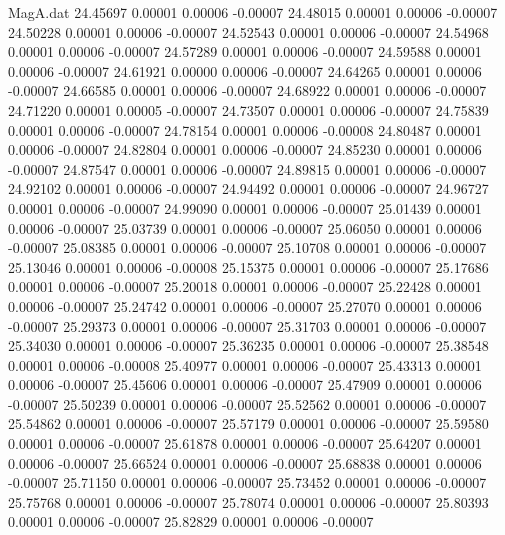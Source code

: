 \begin{filecontents}{MagA.dat}
  24.45697    0.00001    0.00006   -0.00007
  24.48015    0.00001    0.00006   -0.00007
  24.50228    0.00001    0.00006   -0.00007
  24.52543    0.00001    0.00006   -0.00007
  24.54968    0.00001    0.00006   -0.00007
  24.57289    0.00001    0.00006   -0.00007
  24.59588    0.00001    0.00006   -0.00007
  24.61921    0.00000    0.00006   -0.00007
  24.64265    0.00001    0.00006   -0.00007
  24.66585    0.00001    0.00006   -0.00007
  24.68922    0.00001    0.00006   -0.00007
  24.71220    0.00001    0.00005   -0.00007
  24.73507    0.00001    0.00006   -0.00007
  24.75839    0.00001    0.00006   -0.00007
  24.78154    0.00001    0.00006   -0.00008
  24.80487    0.00001    0.00006   -0.00007
  24.82804    0.00001    0.00006   -0.00007
  24.85230    0.00001    0.00006   -0.00007
  24.87547    0.00001    0.00006   -0.00007
  24.89815    0.00001    0.00006   -0.00007
  24.92102    0.00001    0.00006   -0.00007
  24.94492    0.00001    0.00006   -0.00007
  24.96727    0.00001    0.00006   -0.00007
  24.99090    0.00001    0.00006   -0.00007
  25.01439    0.00001    0.00006   -0.00007
  25.03739    0.00001    0.00006   -0.00007
  25.06050    0.00001    0.00006   -0.00007
  25.08385    0.00001    0.00006   -0.00007
  25.10708    0.00001    0.00006   -0.00007
  25.13046    0.00001    0.00006   -0.00008
  25.15375    0.00001    0.00006   -0.00007
  25.17686    0.00001    0.00006   -0.00007
  25.20018    0.00001    0.00006   -0.00007
  25.22428    0.00001    0.00006   -0.00007
  25.24742    0.00001    0.00006   -0.00007
  25.27070    0.00001    0.00006   -0.00007
  25.29373    0.00001    0.00006   -0.00007
  25.31703    0.00001    0.00006   -0.00007
  25.34030    0.00001    0.00006   -0.00007
  25.36235    0.00001    0.00006   -0.00007
  25.38548    0.00001    0.00006   -0.00008
  25.40977    0.00001    0.00006   -0.00007
  25.43313    0.00001    0.00006   -0.00007
  25.45606    0.00001    0.00006   -0.00007
  25.47909    0.00001    0.00006   -0.00007
  25.50239    0.00001    0.00006   -0.00007
  25.52562    0.00001    0.00006   -0.00007
  25.54862    0.00001    0.00006   -0.00007
  25.57179    0.00001    0.00006   -0.00007
  25.59580    0.00001    0.00006   -0.00007
  25.61878    0.00001    0.00006   -0.00007
  25.64207    0.00001    0.00006   -0.00007
  25.66524    0.00001    0.00006   -0.00007
  25.68838    0.00001    0.00006   -0.00007
  25.71150    0.00001    0.00006   -0.00007
  25.73452    0.00001    0.00006   -0.00007
  25.75768    0.00001    0.00006   -0.00007
  25.78074    0.00001    0.00006   -0.00007
  25.80393    0.00001    0.00006   -0.00007
  25.82829    0.00001    0.00006   -0.00007

\end{filecontents}
